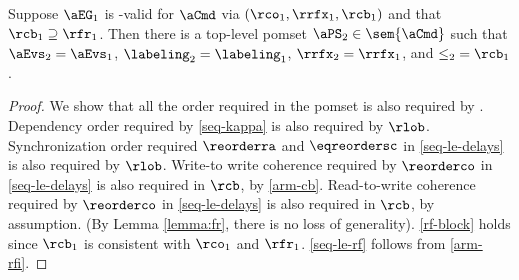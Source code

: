 \begin{theorem}
  Suppose $\aEG_1$ %
  is \EC-valid for $\aCmd$ via $({\rco_1}, {\rrfx_1}, {\rcb_1})$ and that
  ${\rcb_1}\supseteq{\rfr_1}$.  Then there is a top-level pomset
  $\aPS_2\in\sem{\aCmd}$ such that $\aEvs_2=\aEvs_1$,
  $\labeling_2=\labeling_1$, ${\rrfx_2}={\rrfx_1}$, and ${\le_2}={\rcb_1}$.

  \vspace{-.5\baselineskip}
  \begin{proof}
    We show that all the order required in the pomset is also required by
    \armeight{}.  Dependency order required by \ref{seq-kappa} is also
    required by $\rlob$.  Synchronization order required ${\reorderra}$ and
    ${\eqreordersc}$ in \ref{seq-le-delays} is also required by $\rlob$.
    Write-to write coherence required by ${\reorderco}$ in
    \ref{seq-le-delays} is also required in $\rcb$, by \ref{arm-cb}.
    Read-to-write coherence required by ${\reorderco}$ in \ref{seq-le-delays}
    is also required in $\rcb$, by assumption. (By Lemma \ref{lemma:fr},
    there is no loss of generality).  \ref{rf-block} holds since ${\rcb_1}$
    is consistent with ${\rco_1}$ and ${\rfr_1}$.  \ref{seq-le-rf} follows
    from \ref{arm-rfi}.
  \end{proof}
\end{theorem}




